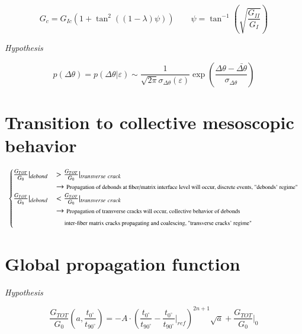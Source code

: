 \documentclass[review]{elsarticle}
\begin{document}
\begin{equation}
G_{c}=G_{Ic}\left(1+\tan^{2}{\left(\left(1-\lambda\right)\psi\right)}\right)\qquad\psi=\tan^{-1}\left(\sqrt{\frac{G_{II}}{G_{I}}}\right)
\end{equation}

\em{Hypothesis}

\begin{equation}
p\left(\Delta\theta\right)=p\left(\Delta\theta|\varepsilon\right)\sim\frac{1}{\sqrt{2\pi}\sigma_{\Delta\theta}\left(\varepsilon\right)}\exp{\left(\frac{\Delta\theta-\bar{\Delta\theta}}{\sigma_{\Delta\theta}}\right)}
\end{equation}

\section{Transition to collective mesoscopic behavior}

\begin{equation}
\begin{cases}
\frac{G_{TOT}}{G_{0}}|_{debond}&>\frac{G_{TOT}}{G_{0}}|_{transverse\ crack}\\ &\rightarrow\text{\scriptsize Propagation of debonds at fiber/matrix interface level will occur, discrete events, "debonds' regime"}\\
\frac{G_{TOT}}{G_{0}}|_{debond}&<\frac{G_{TOT}}{G_{0}}|_{transverse\ crack}\\ &\rightarrow\text{\scriptsize Propagation of transverse cracks will occur, collective behavior of debonds}\\
&\quad\text{\scriptsize inter-fiber matrix cracks propagating and coalescing, "transverse cracks' regime"}\\
\end{cases}
\end{equation}

\section{Global propagation function}

\em{Hypothesis}

\begin{equation}
\frac{G_{TOT}}{G_{0}}\left(a,\frac{t_{0^{\circ}}}{t_{90^{\circ}}}\right)=-A\cdot\left(\frac{t_{0^{\circ}}}{t_{90^{\circ}}}-\frac{t_{0^{\circ}}}{t_{90^{\circ}}}|_{ref}\right)^{2n+1}\sqrt{a}+\frac{G_{TOT}}{G_{0}}|_{0}
\end{equation}
\end{document}
